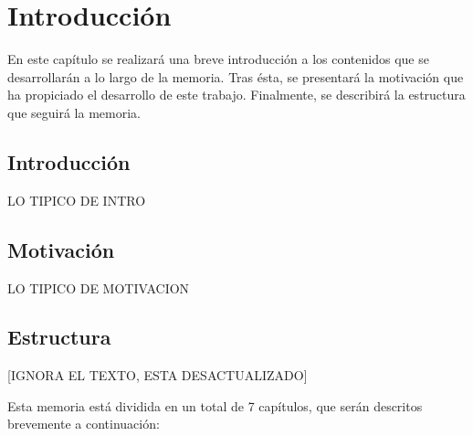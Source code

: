 \chapter{Introducción}

En este capítulo se realizará una breve introducción a los contenidos que se desarrollarán a lo largo de la memoria. Tras ésta, se presentará la motivación que ha propiciado el desarrollo de este trabajo. Finalmente, se describirá la estructura que seguirá la memoria.

\section{Introducción}
LO TIPICO DE INTRO

\section{Motivación}
LO TIPICO DE MOTIVACION

\section{Estructura}
[IGNORA EL TEXTO, ESTA DESACTUALIZADO]

Esta memoria está dividida en un total de 7 capítulos, que serán descritos brevemente a continuación:

